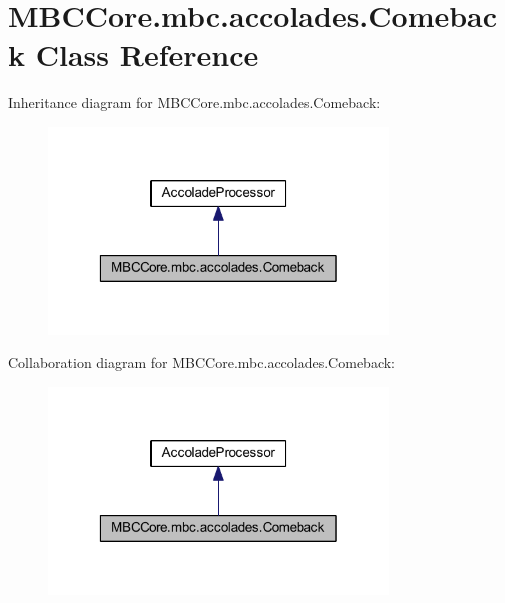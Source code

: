 \hypertarget{class_m_b_c_core_1_1mbc_1_1accolades_1_1_comeback}{\section{M\-B\-C\-Core.\-mbc.\-accolades.\-Comeback Class Reference}
\label{class_m_b_c_core_1_1mbc_1_1accolades_1_1_comeback}
}


Inheritance diagram for M\-B\-C\-Core.\-mbc.\-accolades.\-Comeback\-:\nopagebreak
\begin{figure}[H]
\begin{center}
\leavevmode
\includegraphics[width=256pt]{class_m_b_c_core_1_1mbc_1_1accolades_1_1_comeback__inherit__graph}
\end{center}
\end{figure}


Collaboration diagram for M\-B\-C\-Core.\-mbc.\-accolades.\-Comeback\-:\nopagebreak
\begin{figure}[H]
\begin{center}
\leavevmode
\includegraphics[width=256pt]{class_m_b_c_core_1_1mbc_1_1accolades_1_1_comeback__coll__graph}
\end{center}
\end{figure}
